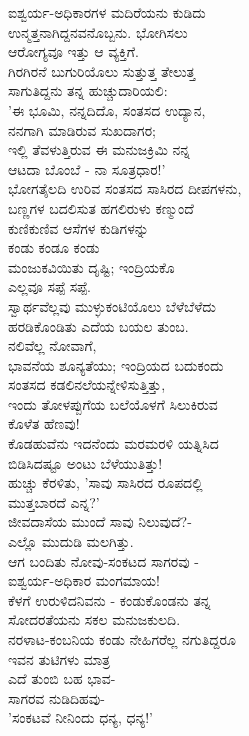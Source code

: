 \begin{myquote}
ಐಶ್ವರ್ಯ-ಅಧಿಕಾರಗಳ ಮದಿರೆಯನು ಕುಡಿದು\\ಉನ್ಮತ್ತನಾಗಿದ್ದನವನೊಬ್ಬನು. ಭೋಗಿಸಲು\\ಆರೋಗ್ಯವೂ ಇತ್ತು ಆ ವ್ಯಕ್ತಿಗೆ.\\ಗಿರಗಿರನೆ ಬುಗುರಿಯೊಲು ಸುತ್ತುತ್ತ ತೇಲುತ್ತ\\ಸಾಗುತಿದ್ದನು ತನ್ನ ಹುಚ್ಚುದಾರಿಯಲಿ:\\'ಈ ಭೂಮಿ, ನನ್ನದಿದೊ, ಸಂತಸದ ಉದ್ಯಾನ,\\ನನಗಾಗಿ ಮಾಡಿರುವ ಸುಖದಾಗರ;\\ಇಲ್ಲಿ ತೆವಳುತ್ತಿರುವ ಈ ಮನುಜಕ್ರಿಮಿ ನನ್ನ\\ಆಟದಾ ಬೊಂಬೆ - ನಾ ಸೂತ್ರಧಾರ!'\\ಭೋಗತೈಲದಿ ಉರಿವ ಸಂತಸದ ಸಾಸಿರದ ದೀಪಗಳನು,\\ಬಣ್ಣಗಳ ಬದಲಿಸುತ ಹಗಲಿರುಳು ಕಣ್ಮುಂದೆ\\ಕುಣಿಕುಣಿವ ಆಸೆಗಳ ಕುಡಿಗಳನ್ನು\\ಕಂಡು ಕಂಡೂ ಕಂಡು\\ಮಂಜುಕವಿಯಿತು ದೃಷ್ಟಿ; ಇಂದ್ರಿಯಕೊ\\ಎಲ್ಲವೂ ಸಪ್ಪೆ ಸಪ್ಪೆ.\\ಸ್ವಾರ್ಥವೆಲ್ಲವು ಮುಳ್ಳುಕಂಟಿಯೊಲು ಬೆಳೆಬೆಳೆದು\\ಹರಡಿಕೊಂಡಿತು ಎದೆಯ ಬಯಲ ತುಂಬ.\\ನಲಿವೆಲ್ಲ ನೋವಾಗೆ,\\ಭಾವನೆಯ ಶೂನ್ಯತೆಯು; ಇಂದ್ರಿಯದ ಬದುಕಂದು\\ಸಂತಸದ ಕಡಲಿನಲೆಯನ್ನೇಳಿಸುತ್ತಿತ್ತು,\\ಇಂದು ತೋಳಪ್ಪುಗೆಯ ಬಲೆಯೊಳಗೆ ಸಿಲುಕಿರುವ\\ಕೊಳೆತ ಹೆಣವು!\\ಕೊಡಹುವೆನು ಇದನೆಂದು ಮರಮರಳಿ ಯತ್ನಿಸಿದ\\ಬಿಡಿಸಿದಷ್ಟೂ ಅಂಟು ಬೆಳೆಯುತಿತ್ತು!\\ಹುಚ್ಚು ಕೆರಳಿತು, 'ಸಾವು ಸಾಸಿರದ ರೂಪದಲ್ಲಿ\\ಮುತ್ತಬಾರದೆ ಎನ್ನ?'\\ಜೀವದಾಸೆಯ ಮುಂದೆ ಸಾವು ನಿಲುವುದೆ?-\\ಎಲ್ಲೊ ಮುದುಡಿ ಮಲಗಿತ್ತು.\\ಆಗ ಬಂದಿತು ನೋವು-ಸಂಕಟದ ಸಾಗರವು -\\ಐಶ್ವರ್ಯ-ಅಧಿಕಾರ ಮಂಗಮಾಯ!\\ಕೆಳಗೆ ಉರುಳಿದನಿವನು - ಕಂಡುಕೊಂಡನು ತನ್ನ\\ಸೋದರತೆಯನು ಸಕಲ ಮನುಜಕುಲದಿ.\\ನರಳಾಟ-ಕಂಬನಿಯ ಕಂಡು ನೇಹಿಗರೆಲ್ಲ ನಗುತಿದ್ದರೂ\\ಇವನ ತುಟಿಗಳು ಮಾತ್ರ\\ಎದೆ ತುಂಬಿ ಬಹ ಭಾವ-\\ಸಾಗರವ ನುಡಿದಿಹವು-\\'ಸಂಕಟವೆ ನೀನಿಂದು ಧನ್ಯ, ಧನ್ಯ!'
\end{myquote}

